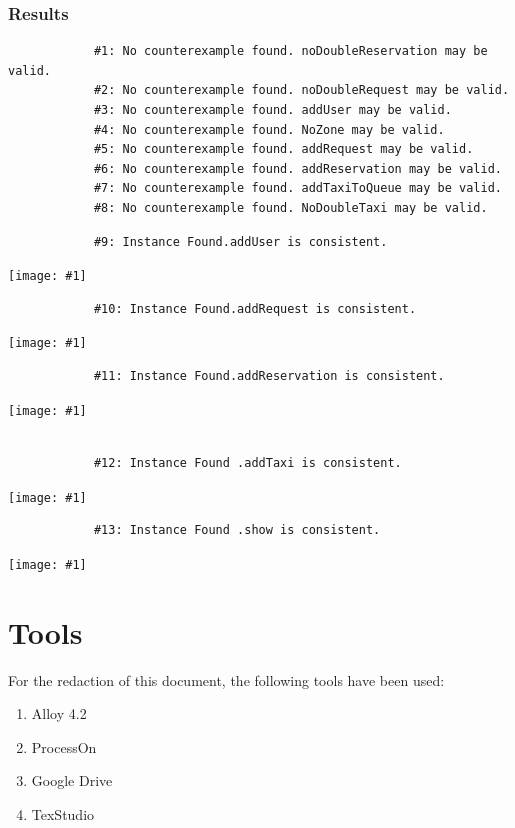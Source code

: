 \documentclass[11pt, a4paper,titlepage]{article}
\newcommand{\image}[1]{
	\begin{center}
		\noindent \texttt{[image: \#1]}
	\end{center}
	}
\begin{document}
		\subsubsection{Results}
		
		\begin{verbatim}
			#1: No counterexample found. noDoubleReservation may be valid.
			#2: No counterexample found. noDoubleRequest may be valid.
			#3: No counterexample found. addUser may be valid.
			#4: No counterexample found. NoZone may be valid.
			#5: No counterexample found. addRequest may be valid.
			#6: No counterexample found. addReservation may be valid.
			#7: No counterexample found. addTaxiToQueue may be valid.
			#8: No counterexample found. NoDoubleTaxi may be valid.
		\end{verbatim}
		
		\begin{verbatim}
			#9: Instance Found.addUser is consistent.
		\end{verbatim}
		\image{diagram_alloy1.png}
		\begin{verbatim}
			#10: Instance Found.addRequest is consistent.
		\end{verbatim}
		\image{diagram_alloy2.png}
		\begin{verbatim}
			#11: Instance Found.addReservation is consistent.
		\end{verbatim}
		\image{diagram_alloy3.png}
		\begin{verbatim}
		
			#12: Instance Found .addTaxi is consistent.
		\end{verbatim}
		\image{diagram_alloy4.png}
		\begin{verbatim}
			#13: Instance Found .show is consistent.
		\end{verbatim}
		\image{diagram_alloy5.png}
		
		\section{Tools}
			For the redaction of this document, the following tools have been used:
			\begin{enumerate}
				\item Alloy 4.2
				\item ProcessOn
				\item Google Drive
				\item TexStudio
			\end{enumerate}
\end{document}
